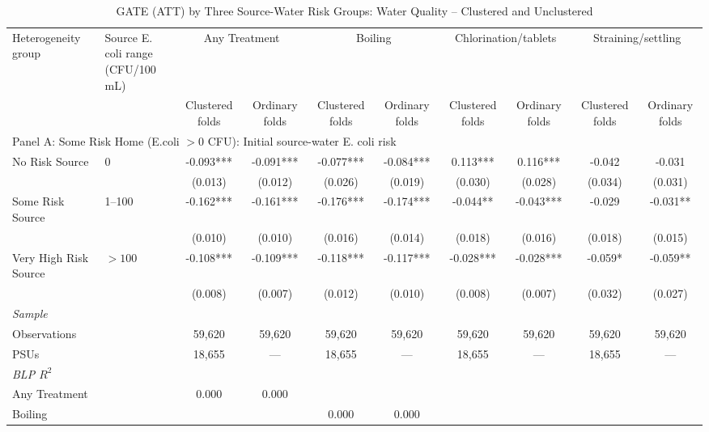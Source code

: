 \begin{landscape}
\begin{table}[p]
\centering
\caption{GATE (ATT) by Three Source-Water Risk Groups: Water Quality -- Clustered and Unclustered}
\label{tab:table_gate_appendix_risk_groups-ecoli}
\scriptsize\setlength{\tabcolsep}{4pt}
\begin{adjustbox}{max width=\linewidth, center}
\begin{tabular}{llcccccccc}
\toprule
Heterogeneity group & \shortstack{Source E. coli range\\(CFU/100 mL)} & \multicolumn{2}{c}{Any Treatment} & \multicolumn{2}{c}{Boiling} & \multicolumn{2}{c}{Chlorination/tablets} & \multicolumn{2}{c}{Straining/settling} \\
 &  & Clustered folds & Ordinary folds & Clustered folds & Ordinary folds & Clustered folds & Ordinary folds & Clustered folds & Ordinary folds \\
\midrule
\multicolumn{10}{l}{Panel A: Some Risk Home (E.coli $>0$ CFU): Initial source-water E. coli risk} \\
No Risk Source & 0 & -0.093*** & -0.091*** & -0.077*** & -0.084*** & 0.113*** & 0.116*** & -0.042 & -0.031 \\
 &  & (0.013) & (0.012) & (0.026) & (0.019) & (0.030) & (0.028) & (0.034) & (0.031) \\
Some Risk Source & 1--100 & -0.162*** & -0.161*** & -0.176*** & -0.174*** & -0.044** & -0.043*** & -0.029 & -0.031** \\
 &  & (0.010) & (0.010) & (0.016) & (0.014) & (0.018) & (0.016) & (0.018) & (0.015) \\
Very High Risk Source & $>100$ & -0.108*** & -0.109*** & -0.118*** & -0.117*** & -0.028*** & -0.028*** & -0.059* & -0.059** \\
 &  & (0.008) & (0.007) & (0.012) & (0.010) & (0.008) & (0.007) & (0.032) & (0.027) \\
\multicolumn{10}{l}{\textit{Sample}} \\
\quad Observations &  & 59,620 & 59,620 & 59,620 & 59,620 & 59,620 & 59,620 & 59,620 & 59,620 \\
\quad PSUs &  & 18,655 & --- & 18,655 & --- & 18,655 & --- & 18,655 & --- \\
\multicolumn{10}{l}{\textit{BLP $R^{2}$}} \\
\quad Any Treatment &  & 0.000 & 0.000 &  &  &  &  &  &  \\
\quad Boiling &  &  &  & 0.000 & 0.000 &  &  &  &  \\

\end{tabular}
\end{adjustbox}
\end{table}
\end{landscape}
